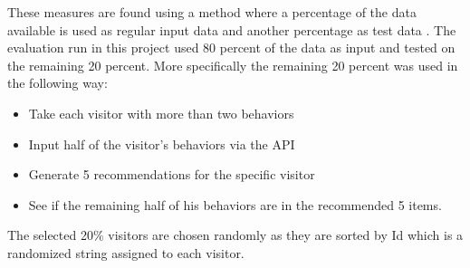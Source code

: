 These measures are found using a method where a percentage of the data available is used as regular input data and another percentage as test data \cite{eval}. The evaluation run in this project used 80 percent of the data as input and tested on the remaining 20 percent. More specifically the remaining 20 percent was used in the following way:
\begin{itemize}
\item Take each visitor with more than two behaviors
\item Input half of the visitor's behaviors via the API
\item Generate 5 recommendations for the specific visitor
\item See if the remaining half of his behaviors are in the recommended 5 items.
\end{itemize}
The selected 20\% visitors are chosen randomly as they are sorted by Id which is a randomized string assigned to each visitor.

